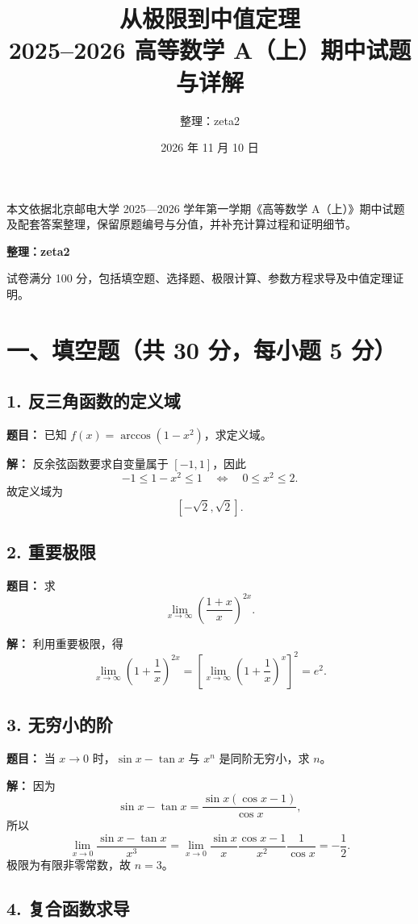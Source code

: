 \documentclass[UTF8,a4paper,11pt,fontset=fandol]{ctexart}
\title{\textbf{从极限到中值定理}\\[5pt]\Large 2025--2026 高等数学 A（上）期中试题与详解}
\author{整理：zeta2}
\date{2026 年 11 月 10 日}
\begin{document}
\maketitle
本文依据北京邮电大学 2025—2026 学年第一学期《高等数学 A（上）》期中试题及配套答案整理，保留原题编号与分值，并补充计算过程和证明细节。

\textbf{整理：zeta2}

试卷满分 100 分，包括填空题、选择题、极限计算、参数方程求导及中值定理证明。



\section*{一、填空题（共 30 分，每小题 5 分）}

\subsection*{1. 反三角函数的定义域}

\textbf{题目：} 已知 $f(x)=\arccos(1-x^2)$，求定义域。

\textbf{解：} 反余弦函数要求自变量属于 $[-1,1]$，因此
\[
-1\le 1-x^2\le 1
\quad\Longleftrightarrow\quad 0\le x^2\le 2.
\]
故定义域为
\[
\boxed{[-\sqrt{2},\sqrt{2}]}.
\]

\subsection*{2. 重要极限}

\textbf{题目：} 求
\[
\lim_{x\to\infty}\left(\frac{1+x}{x}\right)^{2x}.
\]

\textbf{解：} 利用重要极限，得
\[
\lim_{x\to\infty}\left(1+\frac1x\right)^{2x}
=\left[\lim_{x\to\infty}\left(1+\frac1x\right)^x\right]^2
=\boxed{e^2}.
\]

\subsection*{3. 无穷小的阶}

\textbf{题目：} 当 $x\to0$ 时，$\sin x-\tan x$ 与 $x^n$ 是同阶无穷小，求 $n$。

\textbf{解：} 因为
\[
\sin x-\tan x
=\frac{\sin x(\cos x-1)}{\cos x},
\]
所以
\[
\lim_{x\to0}\frac{\sin x-\tan x}{x^3}
=\lim_{x\to0}\frac{\sin x}{x}
\frac{\cos x-1}{x^2}\frac1{\cos x}
=-\frac12.
\]
极限为有限非零常数，故 $\boxed{n=3}$。

\subsection*{4. 复合函数求导}
\end{document}
